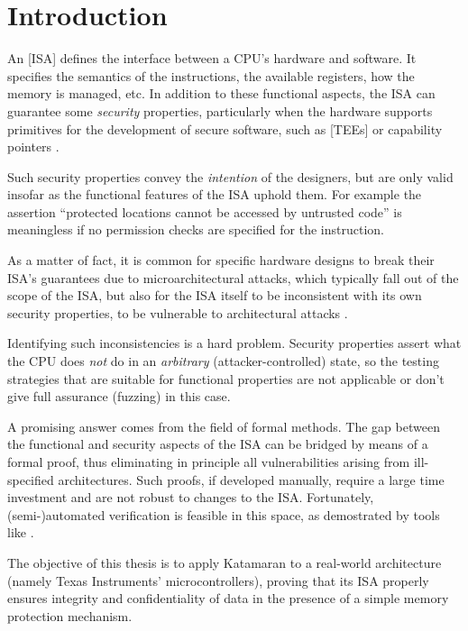 \chapter{Introduction}

An [ISA] \cite{ArmISA} defines the interface between a CPU's hardware and software. It specifies the semantics of the instructions, the available registers, how the memory is managed, etc. In addition to these functional aspects, the ISA can guarantee some \emph{security} properties, particularly when the hardware supports primitives for the development of secure software, such as [TEEs] \cite{SGX} or capability pointers \cite{Watson2023}.

Such security properties convey the \emph{intention} of the designers, but are only valid insofar as the functional features of the ISA uphold them. For example the assertion ``protected locations cannot be accessed by untrusted code'' is meaningless if no permission checks are specified for the  instruction.

As a matter of fact, it is common for specific hardware designs to break their ISA's guarantees due to microarchitectural attacks, which typically fall out of the scope of the ISA, but also for the ISA itself to be inconsistent with its own security properties, \ie to be vulnerable to architectural attacks \cite{Bognar2024}\cite{Fei2021}.

Identifying such inconsistencies is a hard problem. Security properties assert what the CPU does \emph{not} do in an \emph{arbitrary} (attacker-controlled) state, so the testing strategies that are suitable for functional properties are not applicable or don't give full assurance (\eg fuzzing) in this case.



A promising answer comes from the field of formal methods. The gap between the functional and security aspects of the ISA can be bridged by means of a formal proof, thus eliminating in principle all vulnerabilities arising from ill-specified architectures. Such proofs, if developed manually, require a large time investment and are not robust to changes to the ISA. Fortunately, (semi-)automated verification is feasible in this space, as demostrated by tools like  \cite{Huyghebaert2023}.

The objective of this thesis is to apply Katamaran to a real-world architecture (namely Texas Instruments' \msp microcontrollers), proving that its ISA properly ensures integrity and confidentiality of data in the presence of a simple memory protection mechanism.
